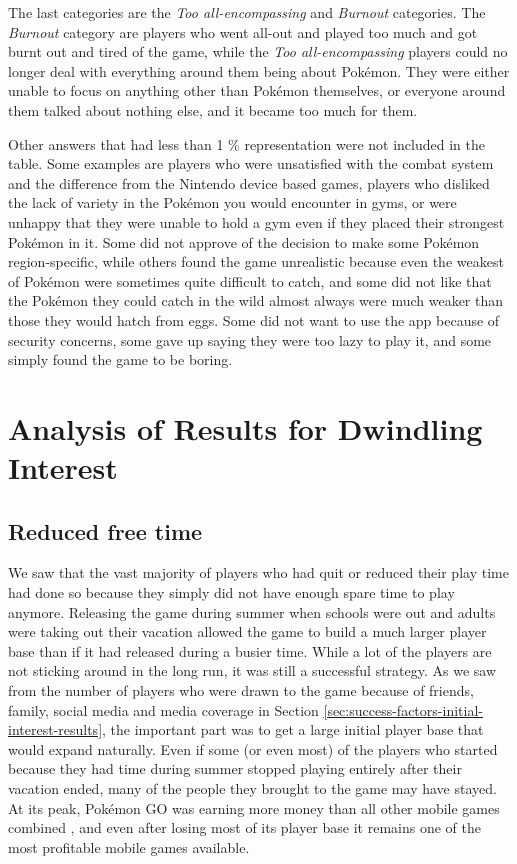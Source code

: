 The last categories are the \emph{Too all-encompassing} and \emph{Burnout} categories. The \emph{Burnout} category are players who went all-out and played too much and got burnt out and tired of the game, while the \emph{Too all-encompassing} players could no longer deal with everything around them being about Pokémon. They were either unable to focus on anything other than Pokémon themselves, or everyone around them talked about nothing else, and it became too much for them.

Other answers that had less than 1 \% representation were not included in the table. Some examples are players who were unsatisfied with the combat system and the difference from the Nintendo device based games, players who disliked the lack of variety in the Pokémon you would encounter in gyms, or were unhappy that they were unable to hold a gym even if they placed their strongest Pokémon in it. Some did not approve of the decision to make some Pokémon region-specific, while others found the game unrealistic because even the weakest of Pokémon were sometimes quite difficult to catch, and some did not like that the Pokémon they could catch in the wild almost always were much weaker than those they would hatch from eggs. Some did not want to use the app because of security concerns, some gave up saying they were too lazy to play it, and some simply found the game to be boring.

\section{Analysis of Results for Dwindling Interest}
\label{sec:success-factors-quitting-analysis}


\subsection{Reduced free time}
\label{sec:reduced-free-time}
We saw that the vast majority of players who had quit or reduced their play time had done so because they simply did not have enough spare time to play anymore. Releasing the game during summer when schools were out and adults were taking out their vacation allowed the game to build a much larger player base than if it had released during a busier time. While a lot of the players are not sticking around in the long run, it was still a successful strategy. As we saw from the number of players who were drawn to the game because of friends, family, social media and media coverage in Section \ref{sec:success-factors-initial-interest-results}, the important part was to get a large initial player base that would expand naturally. Even if some (or even most) of the players who started because they had time during summer stopped playing entirely after their vacation ended, many of the people they brought to the game may have stayed. At its peak, Pokémon GO was earning more money than all other mobile games combined , and even after losing most of its player base it remains one of the most profitable mobile games available.


